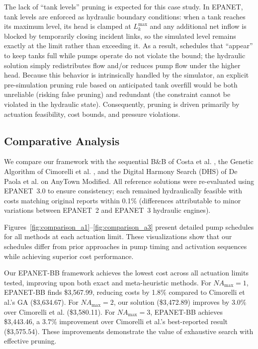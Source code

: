 \documentclass[final,3p,twocolumn]{elsarticle}
\begin{document}
The lack of ``tank levels'' pruning is expected for this case study. In EPANET, tank levels are enforced as hydraulic boundary conditions: when a tank reaches its maximum level, its head is clamped at $L_k^{\max}$ and any additional net inflow is blocked by temporarily closing incident links, so the simulated level remains exactly at the limit rather than exceeding it. As a result, schedules that ``appear'' to keep tanks full while pumps operate do not violate the bound; the hydraulic solution simply redistributes flow and/or reduces pump flow under the higher head. Because this behavior is intrinsically handled by the simulator, an explicit pre-simulation pruning rule based on anticipated tank overfill would be both unreliable (risking false pruning) and redundant (the constraint cannot be violated in the hydraulic state). Consequently, pruning is driven primarily by actuation feasibility, cost bounds, and pressure violations.

\subsection{Comparative Analysis}

We compare our framework with the sequential B\&B of Costa et al. \cite{Costa2016}, the Genetic Algorithm of Cimorelli et al. \cite{Cimorelli2020}, and the Digital Harmony Search (DHS) of De Paola et al. \cite{Paola2024} on AnyTown Modified. All reference solutions were re-evaluated using EPANET~3.0 to ensure consistency; each remained hydraulically feasible with costs matching original reports within 0.1\% (differences attributable to minor variations between EPANET~2 and EPANET~3 hydraulic engines).

Figures~\ref{fig:comparison_a1}--\ref{fig:comparison_a3} present detailed pump schedules for all methods at each actuation limit. These visualizations show that our schedules differ from prior approaches in pump timing and activation sequences while achieving superior cost performance.

Our EPANET-BB framework achieves the lowest cost across all actuation limits tested, improving upon both exact and meta-heuristic methods. For $NA_{\max}=1$, EPANET-BB finds \$3,567.99, reducing costs by 1.8\% compared to Cimorelli et al.'s GA (\$3,634.67). For $NA_{\max}=2$, our solution (\$3,472.89) improves by 3.0\% over Cimorelli et al. (\$3,580.11). For $NA_{\max}=3$, EPANET-BB achieves \$3,443.46, a 3.7\% improvement over Cimorelli et al.'s best-reported result (\$3,575.54). These improvements demonstrate the value of exhaustive search with effective pruning.
\end{document}
